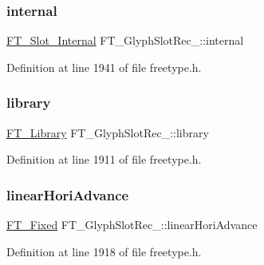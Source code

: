 \subsubsection{\texorpdfstring{internal}{internal}}
{\footnotesize\ttfamily \mbox{\hyperlink{freetype_8h_ab3dc238ecb4be32bc14e4953af931fdd}{F\+T\+\_\+\+Slot\+\_\+\+Internal}} F\+T\+\_\+\+Glyph\+Slot\+Rec\+\_\+\+::internal}



Definition at line 1941 of file freetype.\+h.

\mbox{\label{struct_f_t___glyph_slot_rec___a5415bcbf70efb3aae7a6b77040e21e91}} 
\subsubsection{\texorpdfstring{library}{library}}
{\footnotesize\ttfamily \mbox{\hyperlink{freetype_8h_a92857f8bf079b7b9ef5d3ce74cf89ef5}{F\+T\+\_\+\+Library}} F\+T\+\_\+\+Glyph\+Slot\+Rec\+\_\+\+::library}



Definition at line 1911 of file freetype.\+h.

\mbox{\label{struct_f_t___glyph_slot_rec___a9d0ba6b09729d4f009ef380e267607c3}} 
\subsubsection{\texorpdfstring{linearHoriAdvance}{linearHoriAdvance}}
{\footnotesize\ttfamily \mbox{\hyperlink{fttypes_8h_a5f5a679cc09f758efdd0d1c5feed3c3d}{F\+T\+\_\+\+Fixed}} F\+T\+\_\+\+Glyph\+Slot\+Rec\+\_\+\+::linear\+Hori\+Advance}



Definition at line 1918 of file freetype.\+h.

\mbox{\label{struct_f_t___glyph_slot_rec___abc10f58c3d859e46694515956aa4a1e8}} 
